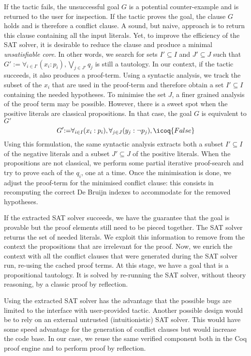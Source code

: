 \documentclass[utf8,a4paper,UKenglish,cleveref, autoref, thm-restate]{lipics-v2021}
\begin{document}
If the tactic fails, the unsuccessful goal $G$ is a potential
counter-example and is returned to the user for inspection.
%
If the tactic proves the goal, the clause $G$ holds and is therefore a
conflict clause.  A sound, but naive, approach is to return this clause
containing all the input literals.
%
Yet, to improve the efficiency of the SAT solver, it is desirable to
reduce the clause and produce a minimal \emph{unsatisfiable
  core}. In other words, we search for sets $I' \subseteq I$ and $J' \subseteq J$ such that
$
  G' {:=} \forall_{i\in I'} (x_i:p_i), \bigvee_{j\in J'} q_j
$ is still a tautology.
% 
In our context, if the tactic succeeds, it also produces a
proof-term.
%
Using a syntactic analysis, we track the subset of the $x_i$ that
are used in the proof-term and therefore obtain a set $I'\subseteq I$ containing the needed hypotheses.
%
To minimise the set $J$, a finer grained analysis of the proof term may be possible.
However, there is a sweet spot when the positive literals are classical propositions.
In that case, the goal $G$ is equivalent to $G'$
\[
  G' {:=} \forall_{i\in I} (x_i:p_i), \forall_{j\in J} (y_j:\neg p_j), \icoq{False}
\]
Using this formulation, the same syntactic analysis extracts both a subset
$I' \subseteq I$ of the negative literals and a subset $J' \subseteq J$ of
the positive literals.  When the propositions are not classical, we
perform some partial iterative proof-search and try to prove each of
the $q_i$, one at a time.
%
Once the minimisation is done, we adjust the proof-term for the minimised
conflict clause: this consists in recomputing the correct De Bruijn
indexes to accommodate for the removed hypotheses. 

If the extracted SAT solver succeeds, we have the guarantee that the
goal is provable but the proof elements still need to be pieced together.
%
The SAT solver returns the set of needed literals.  We exploit this
information to remove from the context the propositions that are
irrelevant for the proof.
%
Now, we enrich the context with all the conflict clauses that were
generated during the SAT solver run, re-using the cached proof terms.  At
this stage, we have a goal that is a propositional tautology.  It is
solved by re-running the SAT solver, without theory reasoning, by a classic
proof by reflection.

Using the extracted SAT solver has the advantage that the possible
bugs are limited to the interface with user-provided tactic.
%
Another possible design would be to rely on an external untrusted
(intuitionistic) SAT solver. This would have some speed advantage for
the generation of conflict clauses but would increase the code
base. In our case, we reuse the same verified component both in the
Coq proof engine and to perform proof by reflection.
\end{document}
